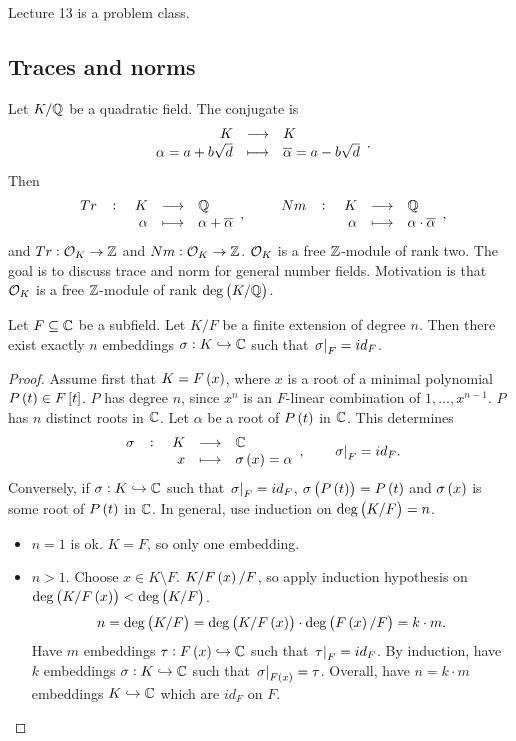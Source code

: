 
Lecture 13 is a problem class.

\pagebreak

\subsection{Traces and norms}


Let $ K / \mathbb{Q} $ be a quadratic field. The conjugate is
$$ \function{K}{K}{\alpha = a + b\sqrt{d}}{\overline{\alpha} = a - b\sqrt{d}}. $$
Then
$$ \function[Tr]{K}{\Q}{\alpha}{\alpha + \overline{\alpha}}, \qquad \function[Nm]{K}{\Q}{\alpha}{\alpha \cdot \overline{\alpha}}, $$
and $ Tr : \mathcal{O}_K \to \mathbb{Z} $ and $ Nm : \mathcal{O}_K \to \mathbb{Z} $. $ \mathcal{O}_K $ is a free $ \mathbb{Z} $-module of rank two. The goal is to discuss trace and norm for general number fields. Motivation is that $ \mathcal{O}_K $ is a free $ \mathbb{Z} $-module of rank $ \deg\br{K / \Q} $.

\begin{proposition}
\label{prop:embeddings}
Let $ F \subseteq \mathbb{C} $ be a subfield. Let $ K / F $ be a finite extension of degree $ n $. Then there exist exactly $ n $ embeddings $ \sigma : K \hookrightarrow \mathbb{C} $ such that $ \left. \sigma \right|_F = id_F $.
\end{proposition}

\begin{proof}
Assume first that $ K = F\br{x} $, where $ x $ is a root of a minimal polynomial $ P\br{t} \in F\sbr{t} $. $ P $ has degree $ n $, since $ x^n $ is an $ F $-linear combination of $ 1, \dots, x^{n - 1} $. $ P $ has $ n $ distinct roots in $ \mathbb{C} $. Let $ \alpha $ be a root of $ P\br{t} $ in $ \mathbb{C} $. This determines
$$ \function[\sigma]{K}{\C}{x}{\sigma\br{x} = \alpha}, \qquad \eval{\sigma}_F = id_F. $$
Conversely, if $ \sigma : K \hookrightarrow \mathbb{C} $ such that $ \left. \sigma \right|_F = id_F $, $ \sigma\br{P\br{t}} = P\br{t} $ and $ \sigma\br{x} $ is some root of $ P\br{t} $ in $ \mathbb{C} $. In general, use induction on $ \deg\br{K / F} = n $.
\begin{itemize}
\item $ n = 1 $ is ok. $ K = F $, so only one embedding.
\item $ n > 1 $. Choose $ x \in K \setminus F $. $ K / F\br{x} / F $, so apply induction hypothesis on $ \deg\br{K / F\br{x}} < \deg\br{K / F} $.
$$ n = \deg\br{K / F} = \deg\br{K / F\br{x}} \cdot \deg\br{F\br{x} / F} = k \cdot m. $$
Have $ m $ embeddings $ \tau : F\br{x} \hookrightarrow \C $ such that $ \left. \tau \right|_F = id_F $. By induction, have $ k $ embeddings $ \sigma : K \hookrightarrow \mathbb{C} $ such that $ \eval{\sigma}_{F\br{x}} = \tau $. Overall, have $ n = k \cdot m $ embeddings $ K \hookrightarrow \mathbb{C} $ which are $ id_F $ on $ F $.
\end{itemize}
\end{proof}


